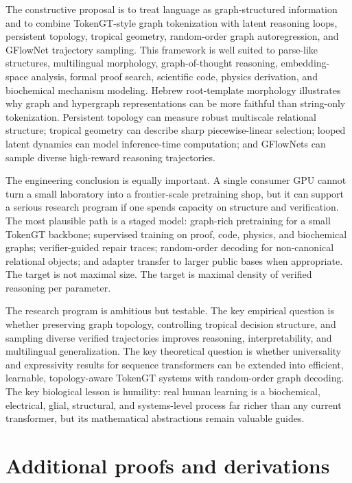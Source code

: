 \documentclass[11pt]{article}
\newcommand{\1}{\mathbf{1}}
\begin{document}
The constructive proposal is to treat language as graph-structured information and to combine TokenGT-style graph tokenization with latent reasoning loops, persistent topology, tropical geometry, random-order graph autoregression, and GFlowNet trajectory sampling. This framework is well suited to parse-like structures, multilingual morphology, graph-of-thought reasoning, embedding-space analysis, formal proof search, scientific code, physics derivation, and biochemical mechanism modeling. Hebrew root-template morphology illustrates why graph and hypergraph representations can be more faithful than string-only tokenization. Persistent topology can measure robust multiscale relational structure; tropical geometry can describe sharp piecewise-linear selection; looped latent dynamics can model inference-time computation; and GFlowNets can sample diverse high-reward reasoning trajectories.

The engineering conclusion is equally important. A single consumer GPU cannot turn a small laboratory into a frontier-scale pretraining shop, but it can support a serious research program if one spends capacity on structure and verification. The most plausible path is a staged model: graph-rich pretraining for a small TokenGT backbone; supervised training on proof, code, physics, and biochemical graphs; verifier-guided repair traces; random-order decoding for non-canonical relational objects; and adapter transfer to larger public bases when appropriate. The target is not maximal size. The target is maximal density of verified reasoning per parameter.

The research program is ambitious but testable. The key empirical question is whether preserving graph topology, controlling tropical decision structure, and sampling diverse verified trajectories improves reasoning, interpretability, and multilingual generalization. The key theoretical question is whether universality and expressivity results for sequence transformers can be extended into efficient, learnable, topology-aware TokenGT systems with random-order graph decoding. The key biological lesson is humility: real human learning is a biochemical, electrical, glial, structural, and systems-level process far richer than any current transformer, but its mathematical abstractions remain valuable guides.

\appendix
\section{Additional proofs and derivations}
\end{document}
